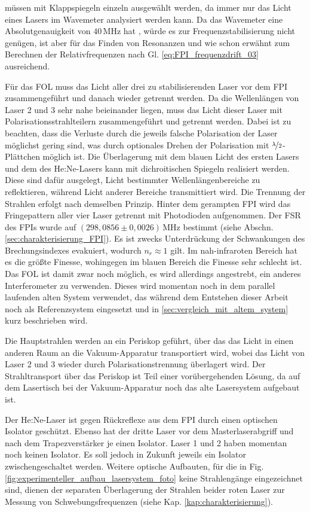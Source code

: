 müssen mit Klappspiegeln einzeln ausgewählt werden, da immer nur das Licht eines Lasers im Wavemeter analysiert werden kann. Da das Wavemeter eine
Absolutgenauigkeit von $40\,$MHz hat
\cite{wavemeter_hardware_guide}, würde es zur Frequenzstabilisierung nicht genügen, ist aber für das Finden von Resonanzen und wie schon erwähnt zum Berechnen der Relativfrequenzen nach Gl. \eqref{eq:FPI_frequenzdrift_03}
ausreichend.\par
Für das FOL muss das Licht aller drei zu stabilisierenden
Laser vor dem FPI zusammengeführt und danach wieder getrennt werden. Da die
Wellenlängen von Laser 2 und 3 sehr nahe beieinander liegen, muss das Licht
dieser Laser mit Polarisationsstrahlteilern zusammengeführt und getrennt werden.
Dabei ist zu beachten, dass die Verluste durch die jeweils falsche Polarisation
der Laser möglichst gering sind, was durch optionales Drehen der
Polarisation mit $\nicefrac{\lambda}{2}$-Plättchen möglich ist. Die Überlagerung
mit dem blauen Licht des ersten Lasers und dem des He:Ne-Lasers kann mit
dichroitischen Spiegeln realisiert werden. Diese sind dafür ausgelegt, Licht
bestimmter Wellenlängenbereiche zu reflektieren, während Licht anderer  Bereiche
transmittiert wird. Die Trennung der Strahlen erfolgt nach demselben Prinzip.
Hinter dem gerampten FPI wird das Fringepattern aller vier Laser getrennt mit
Photodioden aufgenommen. Der FSR des FPIs wurde auf $(298,0856\pm0,0026)\,$MHz
bestimmt (siehe Abschn. \ref{sec:charakterisierung_FPI}).
Es ist zwecks Unterdrückung der Schwankungen des Brechungsindexes evakuiert,
wodurch $n_r\approx1$ gilt. Im nah-infraroten Bereich hat es die größte Finesse, wohingegen im blauen Bereich
die Finesse sehr schlecht ist. Das FOL ist damit zwar noch
möglich, es wird allerdings angestrebt, ein anderes Interferometer zu verwenden.
Dieses wird momentan noch in dem parallel laufenden alten System verwendet, das
während dem Entstehen dieser Arbeit noch als Referenzsystem eingesetzt und in
\ref{sec:vergleich_mit_altem_system} kurz beschrieben wird.\par
Die Hauptstrahlen werden an ein Periskop geführt, über das das Licht in einen
anderen Raum an die Vakuum-Apparatur transportiert wird, wobei das Licht von
Laser 2 und 3 wieder durch Polarisationstrennung überlagert wird. Der
Strahltransport über das Periskop ist Teil einer vorübergehenden Lösung, da auf
dem Lasertisch bei der Vakuum-Apparatur noch das alte Lasersystem aufgebaut
ist.\par Der He:Ne-Laser ist gegen Rückreflexe aus dem FPI durch einen optischen Isolator
geschützt. Ebenso hat der dritte Laser vor dem Masterlaserabgriff und nach dem
Trapezverstärker je einen Isolator. Laser 1 und 2 haben momentan noch keinen
Isolator. Es soll jedoch in Zukunft jeweils ein Isolator zwischengeschaltet
werden. Weitere optische Aufbauten, für die in Fig.
\ref{fig:experimenteller_aufbau_lasersystem_foto} keine Strahlengänge eingezeichnet
sind, dienen der separaten Überlagerung der Strahlen beider roten Laser zur
Messung von Schwebungsfrequenzen (siehe Kap. \ref{kap:charakterisierung}).

